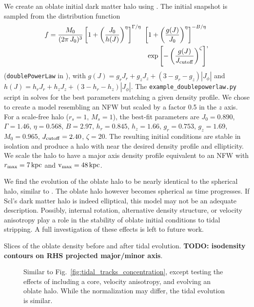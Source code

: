 We create an oblate initial dark matter halo using \agama{}. The initial
snapshot is sampled from the distribution function \begin{equation}{
\begin{split}
f = \frac{M_0}{(2\pi\,J_0)^3} \left[1 + \left(\frac{J_0}{h(J)}\right)^\eta\right]^{\Gamma / \eta} \ \left[1 + \left(\frac{g(J)}{J_0}\right)^\eta\right]^{-B/\eta} \\ \ \exp\left[-\left(\frac{g(J)}{J_{\rm cutoff}} \right)^\zeta\right] 
\end{split},
}\end{equation} (\texttt{doublePowerLaw} in \agama{}), with
\(g(J) = g_r J_r + g_z J_z + (3-g_r - g_z) |J_\phi|\) and
\(h(J) = h_rJ_r + h_zJ_z + (3-h_r-h_z) |J_\phi|\). The
\texttt{example\_doublepowerlaw.py} script in \Agama{} solves for the
best parameters matching a given density profile. We chose to create a
model resembling an NFW but scaled by a factor 0.5 in the \(z\) axis.
For a scale-free halo (\(r_s=1\), \(M_s=1\)), the best-fit parameters
are \(J_0=0.890\), \(\Gamma=1.46\), \(\eta=0.568\), \(B=2.97\),
\(h_r=0.845\), \(h_z=1.66\), \(g_r=0.753\), \(g_z=1.69\), \(M_0=0.965\),
\(J_{\rm cutoff}=2.40\), \(\zeta=20\). The resulting initial conditions
are stable in isolation and produce a halo with near the desired density
profile and ellipticity. We scale the halo to have a major axis density
profile equivalent to an NFW with \(r_{\rm max} = 7\,{\rm kpc}\) and
\({\rm v}_{\rm max}=48\,{\rm kpc}\).

We find the evolution of the oblate halo to be nearly identical to the
spherical halo, similar to \citet{battaglia+sollima+nipoti2015}. The
oblate halo however becomes spherical as time progresses. If Scl's dark
matter halo is indeed elliptical, this model may not be an adequate
description. Possibly, internal rotation, alternative density structure,
or velocity anisotropy play a role in the stability of oblate initial
conditions to tidal stripping. A full investigation of these effects is
left to future work.


Slices of the oblate density before and after tidal evolution.
\textbf{TODO: isodensity contours on RHS projected major/minor axis}.

\begin{figure}
\centering
{}
\caption[Tidal dependence on halo structure]{Similar to
Fig.~\ref{fig:tidal_tracks_concentration}, except testing the effects of
including a core, velocity anisotropy, and evolving an oblate halo.
While the normalization may differ, the tidal evolution is
similar.}\label{fig:tidal_tracks_structure}
\end{figure}

